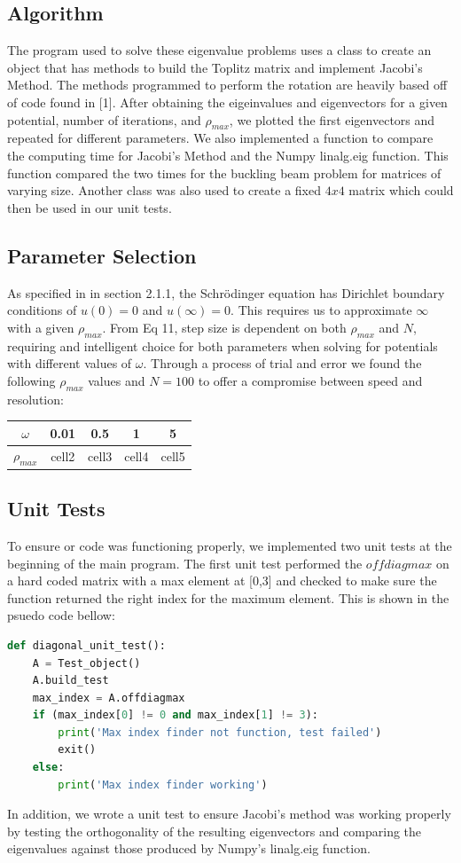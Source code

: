 \documentclass{emulateapj}
\begin{document}
\subsection{Algorithm}
The program used to solve these eigenvalue problems uses a class to create an object that has methods to build the Toplitz matrix and implement Jacobi's Method. The methods programmed to perform the rotation are heavily based off of code found in [1].  After obtaining the eigeinvalues and eigenvectors for a given potential, number of iterations, and $\rho_{max}$, we plotted the first eigenvectors and repeated for different parameters. We also implemented a function to compare the computing time for Jacobi's Method and the Numpy linalg.eig function. This function compared the two times for the buckling beam problem for matrices of varying size. Another class was also used to create a fixed $4x4$ matrix which could then be used in our unit tests.
\subsection{Parameter Selection}
As specified in in section 2.1.1, the Schrödinger equation has Dirichlet boundary conditions of $u(0)=0$ and $u(\infty)=0$. This requires us to approximate $\infty$ with a given $\rho_{max}$. From Eq 11, step size is dependent on both $\rho_{max}$ and $N$, requiring and intelligent choice for both parameters when solving for potentials with different values of $\omega$. Through a process of trial and error we found the following $\rho_{max}$ values and $N = 100$ to offer a compromise between speed and resolution:
\begin{center}
\begin{tabular}{ |c|c|c|c|c| }
\hline
$\omega$ & 0.01 & 0.5 & 1 & 5 \\
\hline
$\rho_{max}$ & cell2 & cell3 & cell4 & cell5 \\
\hline
\end{tabular}
\end{center}
\subsection{Unit Tests}
To ensure or code was functioning properly, we implemented two unit tests at the beginning of the main program. The first unit test performed the $offdiagmax$ on a hard coded matrix with a max element at [0,3] and checked to make sure the function returned the right index for the maximum element. This is shown in the psuedo code bellow:
\begin{lstlisting}[language=Python]
def diagonal_unit_test():
    A = Test_object()
    A.build_test
    max_index = A.offdiagmax
    if (max_index[0] != 0 and max_index[1] != 3):
        print('Max index finder not function, test failed')
        exit()
    else:
        print('Max index finder working')
\end{lstlisting}
In addition, we wrote a unit test to ensure Jacobi's method was working properly by testing the orthogonality of the resulting eigenvectors and comparing the eigenvalues against those produced by Numpy's linalg.eig function.
\end{document}
